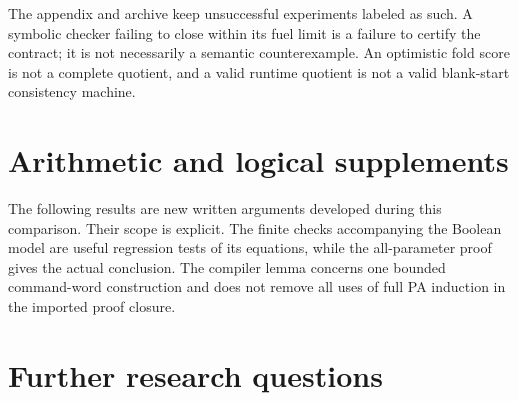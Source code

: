 \documentclass[10pt,letterpaper]{article}
\begin{document}
The appendix and archive keep unsuccessful experiments labeled as such.
A symbolic checker failing to close within its fuel limit is a failure
to certify the contract; it is not necessarily a semantic counterexample.
An optimistic fold score is not a complete quotient, and a valid
runtime quotient is not a valid blank-start consistency machine.

\section{Arithmetic and logical supplements}

The following results are new written arguments developed during this
comparison. Their scope is explicit. The finite checks accompanying
the Boolean model are useful regression tests of its equations, while
the all-parameter proof gives the actual conclusion. The compiler
lemma concerns one bounded command-word construction and does not
remove all uses of full PA induction in the imported proof closure.



\section{Further research questions}
\end{document}
